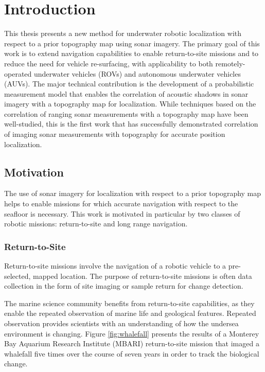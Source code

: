 
\chapter{Introduction}
\label{ch.Introduction}

This thesis presents a new method for underwater robotic localization with respect to a prior topography map using sonar imagery.  
The primary goal of this work is to extend navigation capabilities to enable return-to-site missions and to reduce the need for vehicle re-surfacing, with applicability to both remotely-operated underwater vehicles (ROVs) and autonomous underwater vehicles (AUVs).
The major technical contribution is the development of a probabilistic measurement model that enables the correlation of acoustic shadows in sonar imagery with a topography map for localization.  
While techniques based on the correlation of ranging sonar measurements with a topography map have been well-studied, this is the first work that has successfully demonstrated correlation of imaging sonar measurements with topography for accurate position localization.

\section{Motivation}
\label{intro.Motivation}

The use of sonar imagery for localization with respect to a prior topography map helps to enable missions for which accurate navigation with respect to the seafloor is necessary.  This work is motivated in particular by two classes of robotic missions: return-to-site and long range navigation.

\subsection{Return-to-Site}
\label{intro.Motivation.Return}

Return-to-site missions involve the navigation of a robotic vehicle to a pre-selected, mapped location.  
The purpose of return-to-site missions is often data collection in the form of site imaging or sample return for change detection.

The marine science community benefits from return-to-site capabilities, as they enable the repeated observation of marine life and geological features.  
Repeated observation provides scientists with an understanding of how the undersea environment is changing.  Figure \ref{fig:whalefall} presents the results of a Monterey Bay Aquarium Research Institute (MBARI) return-to-site mission that imaged a whalefall five times over the course of seven years in order to track the biological change.

